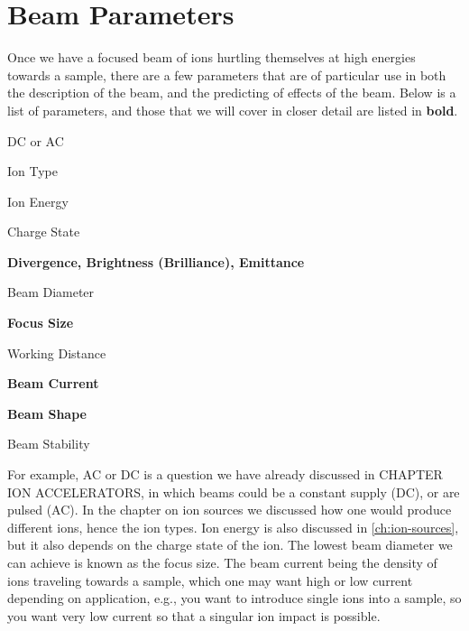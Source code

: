 

\chapter{Beam Parameters}\label{ch:beam-parameters}

Once we have a focused beam of ions hurtling themselves at high energies towards a sample, there are a few parameters that are of particular use in both the description of the beam, and the predicting of effects of the beam.
Below is a list of parameters, and those that we will cover in closer detail are listed in \textbf{bold}.
\begin{myitemize}
	\item DC or AC
	\item Ion Type
	\item Ion Energy
	\item Charge State
	\item \textbf{Divergence, Brightness (Brilliance), Emittance}
	\item Beam Diameter
	\item \textbf{Focus Size}
	\item Working Distance
	\item \textbf{Beam Current }
	\item \textbf{Beam Shape}
	\item Beam Stability
\end{myitemize}
For example, AC or DC is a question we have already discussed in CHAPTER ION ACCELERATORS, in which beams could be a constant supply (DC), or are pulsed (AC).
In the chapter on ion sources we discussed how one would produce different ions, hence the ion types.
Ion energy is also discussed in \ref{ch:ion-sources}, but it also depends on the charge state of the ion.
The lowest beam diameter we can achieve is known as the focus size.
The beam current being the density of ions traveling towards a sample, which one may want high or low current depending on application, e.g., you want to introduce single ions into a sample, so you want very low current so that a singular ion impact is possible.

